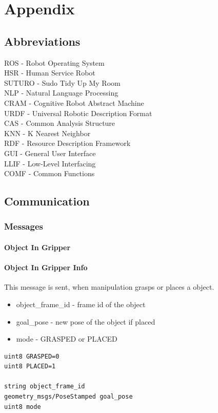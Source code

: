 \documentclass[main.tex]{subfiles}
\begin{document}
\begingroup

\renewcommand{\cleardoublepage}{}

\renewcommand{\clearpage}{}
	\newpage
	\chapter{Appendix}
		\section{Abbreviations}
		ROS - Robot Operating System \\
		HSR - Human Service Robot \\
		SUTURO - Sudo Tidy Up My Room \\
		NLP - Natural Language Processing \\
		CRAM - Cognitive Robot Abstract Machine \\
		URDF - Universal Robotic Description Format \\
		CAS - Common Analysis Structure\\
		KNN - K Nearest Neighbor\\
		RDF - Resource Description Framework\\
		GUI - General User Interface \\
		LLIF - Low-Level Interfacing \\
		COMF - Common Functions \\
		\section{Communication}
			\subsection{Messages}
			\label{msgs}
				\subsubsection{Object In Gripper}\label{msg_obj_in_gripper}
				\subsubsection{Object In Gripper Info}
				This message is sent, when manipulation grasps or places a object.
				\begin{itemize}
					\item object\_frame\_id - frame id of the object
					\item goal\_pose - new pose of the object if placed
					\item mode - GRASPED or PLACED
				\end{itemize}
					\begin{lstlisting}
uint8 GRASPED=0
uint8 PLACED=1
		
string object_frame_id
geometry_msgs/PoseStamped goal_pose
uint8 mode
\end{lstlisting}
\end{document}
